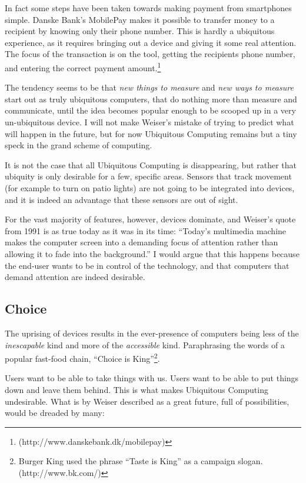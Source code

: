 In fact some steps have been taken towards making payment from smartphones simple. Danske Bank's MobilePay makes it possible to transfer money
to a recipient by knowing only their phone number. This is hardly a ubiquitous experience, as it requires bringing out a device and giving it
some real attention. The focus of the transaction is on the tool, getting the recipients phone number, and entering the correct payment
amount.\footnote{(http://www.danskebank.dk/mobilepay)}

The tendency seems to be that \emph{new things to measure} and \emph{new ways to measure} start out as truly ubiquitous computers, that do
nothing more than measure and communicate, until the idea becomes popular enough to be scooped up in a very un-ubiquitous device. I will
not make Weiser's mistake of trying to predict what will happen in the future, but for now Ubiquitous Computing remains but a tiny speck in the
grand scheme of computing.

It is not the case that all Ubiquitous Computing is disappearing, but rather
that ubiquity is only desirable for a few, specific areas. Sensors that track movement (for example to turn on patio lights) are not going to be integrated
into devices, and it is indeed an advantage that these sensors are out of sight.

For the vast majority of features, however, devices dominate, and Weiser's quote from 1991 is as true today as it was in its
time: ``Today's multimedia machine makes the computer screen into a demanding focus of attention rather than allowing it to fade into the
background.''\cite{weiser91} I would argue that this happens because the end-user wants to be in control of the technology, and that
computers that demand attention are indeed desirable.

\subsection*{Choice}

The uprising of devices results in the ever-presence of computers being less of the \emph{inescapable} kind and more of the \emph{accessible}
kind. Paraphrasing the words of a popular fast-food chain, ``Choice is King''\footnote{Burger King used the phrase ``Taste is King'' as a campaign slogan. (http://www.bk.com/)}.

Users want to be able to take things with us. Users want to be able to put things down and leave them behind. This is what makes Ubiquitous Computing undesirable.
What is by Weiser described as a great future, full of possibilities, would be dreaded by many:

